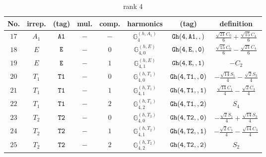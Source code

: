 \documentclass[fleqn,8pt]{jsarticle}
\begin{document}
\begin{table}[ht!]
\begin{center}
\caption{rank 4}
\renewcommand{\arraystretch}{1.3}
\begin{tabular}{cccccccc} \hline \hline
No. & irrep. & (tag) & mul. & comp. & harmonics & (tag) & definition \\ \hline
$ 17 $ & $ A_{1} $ & $ {\tt A1} $ & $ - $ & $ - $ & $ \mathbb{G}_{4}^{(h,A_{1})} $ & $ {\tt Gh(4,A1,,)} $ & $ \frac{\sqrt{21} C_{0}}{6} + \frac{\sqrt{15} C_{4}}{6} $ \\
$ 18 $ & $ E $ & $ {\tt E} $ & $ - $ & $ 0 $ & $ \mathbb{G}_{4,0}^{(h,E)} $ & $ {\tt Gh(4,E,,0)} $ & $ \frac{\sqrt{15} C_{0}}{6} - \frac{\sqrt{21} C_{4}}{6} $ \\
$ 19 $ & $ E $ & $ {\tt E} $ & $ - $ & $ 1 $ & $ \mathbb{G}_{4,1}^{(h,E)} $ & $ {\tt Gh(4,E,,1)} $ & $ - C_{2} $ \\
$ 20 $ & $ T_{1} $ & $ {\tt T1} $ & $ - $ & $ 0 $ & $ \mathbb{G}_{4,0}^{(h,T_{1})} $ & $ {\tt Gh(4,T1,,0)} $ & $ - \frac{\sqrt{14} S_{1}}{4} - \frac{\sqrt{2} S_{3}}{4} $ \\
$ 21 $ & $ T_{1} $ & $ {\tt T1} $ & $ - $ & $ 1 $ & $ \mathbb{G}_{4,1}^{(h,T_{1})} $ & $ {\tt Gh(4,T1,,1)} $ & $ \frac{\sqrt{14} C_{1}}{4} - \frac{\sqrt{2} C_{3}}{4} $ \\
$ 22 $ & $ T_{1} $ & $ {\tt T1} $ & $ - $ & $ 2 $ & $ \mathbb{G}_{4,2}^{(h,T_{1})} $ & $ {\tt Gh(4,T1,,2)} $ & $ S_{4} $ \\
$ 23 $ & $ T_{2} $ & $ {\tt T2} $ & $ - $ & $ 0 $ & $ \mathbb{G}_{4,0}^{(h,T_{2})} $ & $ {\tt Gh(4,T2,,0)} $ & $ - \frac{\sqrt{2} S_{1}}{4} + \frac{\sqrt{14} S_{3}}{4} $ \\
$ 24 $ & $ T_{2} $ & $ {\tt T2} $ & $ - $ & $ 1 $ & $ \mathbb{G}_{4,1}^{(h,T_{2})} $ & $ {\tt Gh(4,T2,,1)} $ & $ - \frac{\sqrt{2} C_{1}}{4} - \frac{\sqrt{14} C_{3}}{4} $ \\
$ 25 $ & $ T_{2} $ & $ {\tt T2} $ & $ - $ & $ 2 $ & $ \mathbb{G}_{4,2}^{(h,T_{2})} $ & $ {\tt Gh(4,T2,,2)} $ & $ S_{2} $ \\
 \hline \hline
\end{tabular}
\end{center}
\end{table}
\end{document}
